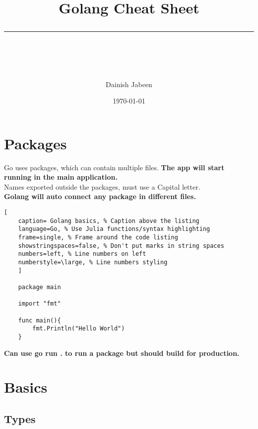 \documentclass[11pt]{scrartcl} %
\title{	
	\normalfont\normalsize
	\vspace{20pt} %
	{\huge Golang Cheat Sheet}\\ %
	\vspace{12pt} %
	\rule{\linewidth}{2pt}\\ %
}
\author{\small Dainish Jabeen} %
\date{\normalsize\today} %
\begin{document}
\maketitle %

\section{Packages}

Go uses packages, which can contain multiple files. \textbf{The app will start running in the main 
application.}\\

Names exported outside the packages, must use a Capital letter.\\

\textbf{Golang will auto connect any package in different files.}

\begin{lstlisting}[
	caption= Golang basics, % Caption above the listing
	language=Go, % Use Julia functions/syntax highlighting
	frame=single, % Frame around the code listing
	showstringspaces=false, % Don't put marks in string spaces
	numbers=left, % Line numbers on left
	numberstyle=\large, % Line numbers styling
	]

	package main

	import "fmt"

	func main(){
		fmt.Println("Hello World")
	}

\end{lstlisting}

\textbf{Can use go run . to run a package but should build for production.}

\newpage

\section{Basics}

\subsection{Types}
\end{document}
